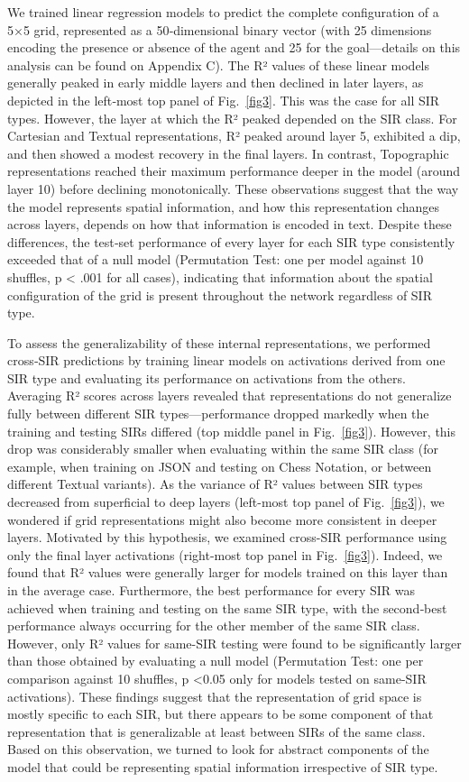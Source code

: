 \documentclass[runningheads]{llncs}
\begin{document}
We trained linear regression models to predict the complete configuration of a 5×5 grid, represented as a 50‑dimensional binary vector (with 25 dimensions encoding the presence or absence of the agent and 25 for the goal—details on this analysis can be found on Appendix C). The R² values of these linear models generally peaked in early middle layers and then declined in later layers, as depicted in the left‑most top panel of Fig.~\ref{fig3}. This was the case for all SIR types. However, the layer at which the R² peaked depended on the SIR class. For Cartesian and Textual representations, R² peaked around layer 5, exhibited a dip, and then showed a modest recovery in the final layers. In contrast, Topographic representations reached their maximum performance deeper in the model (around layer 10) before declining monotonically. These observations suggest that the way the model represents spatial information, and how this representation changes across layers, depends on how that information is encoded in text. Despite these differences, the test‐set performance of every layer for each SIR type consistently exceeded that of a null model (Permutation Test: one per model against 10 shuffles, p < .001 for all cases), indicating that information about the spatial configuration of the grid is present throughout the network regardless of SIR type.

To assess the generalizability of these internal representations, we performed cross‑SIR predictions by training linear models on activations derived from one SIR type and evaluating its performance on activations from the others. Averaging R² scores across layers revealed that representations do not generalize fully between different SIR types—performance dropped markedly when the training and testing SIRs differed (top middle panel in Fig.~\ref{fig3}). However, this drop was considerably smaller when evaluating within the same SIR class (for example, when training on JSON and testing on Chess Notation, or between different Textual variants). As the variance of R² values between SIR types decreased from superficial to deep layers (left-most top panel of Fig.~\ref{fig3}), we wondered if grid representations might also become more consistent in deeper layers. Motivated by this hypothesis, we examined cross-SIR performance using only the final layer activations (right-most top panel in Fig.~\ref{fig3}). Indeed, we found that R² values were generally larger for models trained on this layer than in the average case. Furthermore, the best performance for every SIR was achieved when training and testing on the same SIR type, with the second‑best performance always occurring for the other member of the same SIR class. However, only R² values for same-SIR testing were found to be significantly larger than those obtained by evaluating a null model (Permutation Test: one per comparison against 10 shuffles, p <0.05 only for models tested on same-SIR activations). These findings suggest that the representation of grid space is mostly specific to each SIR, but there appears to be some component of that representation that is generalizable at least between SIRs of the same class. Based on this observation, we turned to look for abstract components of the model that could be representing spatial information irrespective of SIR type.
\end{document}
